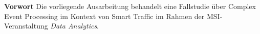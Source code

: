 \documentclass[paper,oneside,onecolumn,notitlepage,bibtotocnumbered,fontsize=12pt,bigheadings,ngerman]{scrartcl}
\newcommand{\sectionnumbering}[1]{%
  \setcounter{section}{0}%
   \renewcommand{\thesection}{\csname #1\endcsname{section}}}
\begin{document}


{\Large \textbf{Vorwort}}
\bigskip
Die vorliegende Ausarbeitung behandelt eine Fallstudie über Complex Event Processing im Kontext von Smart Traffic im Rahmen der MSI-Veranstaltung \textit{Data Analytics}.


\normalsize
\setlength{\parindent}{0pt}
\newpage
\sectionnumbering{Roman} 
\tableofcontents
\clearpage
\listoffigures 
\clearpage 
\listoftables 
\clearpage
{} 
\sectionnumbering{arabic} 




\end{document}
